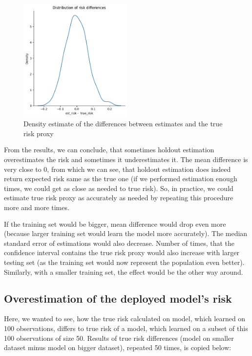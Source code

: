 \documentclass{article}
\begin{document}
\begin{figure}
    \centering
    \includegraphics[width=0.5\textwidth]{homework-02/plots/risk_differences_1.png}
    \caption{Density estimate of the differences between estimates and the true risk proxy}
    \label{fig:risk_differences_1}
\end{figure}

From the results, we can conclude, that sometimes holdout estimation overestimates the risk and sometimes it underestimates it. The mean difference is very close to 0, from which we can see, that holdout estimation does indeed return expected risk same as the true one (if we performed estimation enough times, we could get as close as needed to true risk). So, in practice, we could estimate true risk proxy as accurately as needed by repeating this procedure more and more times.

If the training set would be bigger, mean difference would drop even more (because larger training set would learn the model more accurately). The median standard error of estimations would also decrease. Number of times, that the confidence interval contains the true risk proxy would also increase with larger testing set (as the training set would now represent the population even better). Similarly, with a smaller training set, the effect would be the other way around.

\subsection{Overestimation of the deployed model’s risk}

Here, we wanted to see, how the true risk calculated on model, which learned on 100 observations, differs to true risk of a model, which learned on a subset of this 100 observations of size 50. Results of true risk differences (model on smaller dataset minus model on bigger dataset), repeated 50 times, is copied below:
\end{document}
